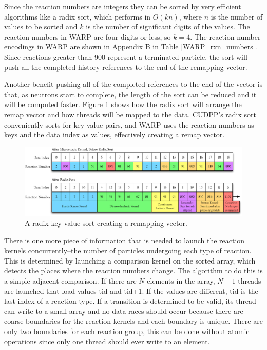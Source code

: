 Since the reaction numbers are integers they can be sorted by very efficient algorithms like a radix sort, which performs in $O(kn)$, where $n$ is the number of values to be sorted and $k$ is the number of significant digits of the values.  The reaction numbers in WARP are four digits or less, so $k=4$.  The reaction number encodings in WARP are shown in Appendix B in Table \ref{WARP_rxn_numbers}.  Since reactions greater than 900 represent a terminated particle, the sort will push all the completed history references to the end of the remapping vector.  

Another benefit pushing all of the completed references to the end of the vector is that, as neutrons start to complete, the length of the sort can be reduced and it will be computed faster.  Figure \ref{radix_sort} shows how the radix sort will arrange the remap vector and how threads will be mapped to the data.  CUDPP's radix sort conveniently sorts for key-value pairs, and WARP uses the reaction numbers as keys and the data index as values, effectively creating a remap vector.

\begin{figure}[h!] 
\centering
\includegraphics[width=1.0\textwidth]{graphics/radix_horiz.eps}
\caption{A radix key-value sort creating a remapping vector. \label{radix_sort} }
\end{figure}

There is one more piece of information that is needed to launch the reaction kernels concurrently--the number of particles undergoing each type of reaction.  This is determined by launching a comparison kernel on the sorted array, which detects the places where the reaction numbers change.  The algorithm to do this is a simple adjacent comparison.  If there are $N$ elements in the array, $N-1$ threads are launched that load values tid and tid+1.  If the values are different, tid is the last index of a reaction type. If a transition is determined to be valid, its thread can write to a small array and no data races should occur because there are coarse boundaries for the reaction kernels and each boundary is unique.  There are only two boundaries for each reaction group, this %
 can be done without atomic operations since only one thread should ever write to an element.  
 
